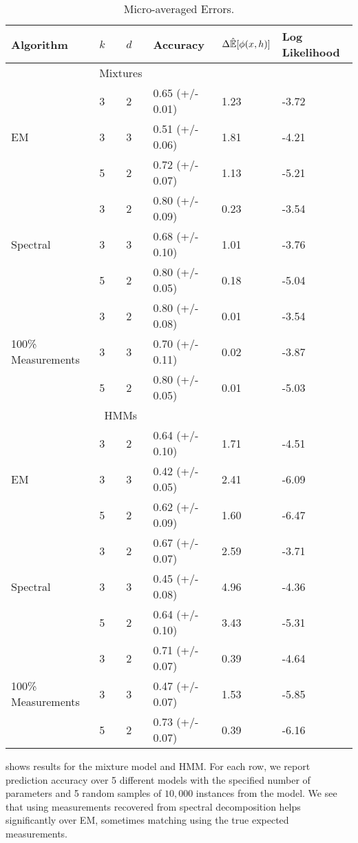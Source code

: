 \begin{table}
    \label{tab:errors}
    \begin{tabular}{l | l l | l l l }
        Algorithm & $k$ & $d$ & Accuracy & $\Delta \hat {\mathbb{E}}[\phi(x,h)]$ & Log Likelihood \\ \hline
        & \multicolumn{2}{|c|}{Mixtures} & & & \\ \hline
        \multirow{3}{*}{EM} 
        & 3 & 2 & 0.65 (+/- 0.01) & 1.23 & -3.72 \\
        & 3 & 3 & 0.51 (+/- 0.06) & 1.81 & -4.21\\
        & 5 & 2 & 0.72 (+/- 0.07) & 1.13 & -5.21\\ \hline
        \multirow{3}{*}{Spectral} 
        & 3 & 2 & 0.80 (+/- 0.09) & 0.23 & -3.54 \\
        & 3 & 3 & 0.68 (+/- 0.10) & 1.01 & -3.76 \\
        & 5 & 2 & 0.80 (+/- 0.05) & 0.18 & -5.04 \\ \hline
        \multirow{3}{*}{100\% Measurements} 
        & 3 & 2 & 0.80 (+/- 0.08) & 0.01& -3.54 \\
        & 3 & 3 & 0.70 (+/- 0.11) & 0.02& -3.87 \\
        & 5 & 2 & 0.80 (+/- 0.05) & 0.01& -5.03 \\ \hline
        & \multicolumn{2}{|c|}{HMMs} & & & \\ \hline
        \multirow{3}{*}{EM} 
& 3 & 2 & 0.64 (+/- 0.10) & 1.71 & -4.51 \\  
& 3 & 3 & 0.42 (+/- 0.05) & 2.41 & -6.09 \\  
& 5 & 2 & 0.62 (+/- 0.09) & 1.60 & -6.47 \\  \hline
        \multirow{3}{*}{Spectral} 
& 3 & 2 & 0.67 (+/- 0.07) & 2.59 & -3.71 \\ 
& 3 & 3 & 0.45 (+/- 0.08) & 4.96 & -4.36 \\ 
& 5 & 2 & 0.64 (+/- 0.10) & 3.43 & -5.31 \\ \hline
        \multirow{3}{*}{100\% Measurements} 
& 3 & 2 & 0.71 (+/- 0.07) & 0.39 & -4.64 \\ 
& 3 & 3 & 0.47 (+/- 0.07) & 1.53 & -5.85 \\ 
& 5 & 2 & 0.73 (+/- 0.07) & 0.39 & -6.16 \\ \hline
    \end{tabular}
    \caption{Micro-averaged Errors.}
\end{table}

 shows results for the mixture model and HMM.
For each row, we report prediction accuracy
over 5 different models with the specified number of parameters and 5 random
samples of $10,000$ instances from the model. 
We see that using measurements recovered from spectral decomposition
helps significantly over EM, sometimes matching
using the true expected measurements.

